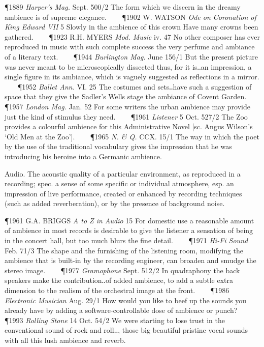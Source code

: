 \begin{description}[wide, labelwidth=!, labelindent=0pt]
\begin{myenumerate}
\P 1889 \textit{Harper's Mag.} Sept. 500/2 The form which we discern in the dreamy ambience is of supreme elegance.    
\P 1902 W. WATSON \textit{Ode on Coronation of King Edward VII} 5 Slowly in the ambience of this crown Have many crowns been gathered.    
\P 1923 R.H. MYERS \textit{Mod. Music} iv. 47 No other composer has ever reproduced in music with such complete success the very perfume and ambiance of a literary text.    
\P 1944 \textit{Burlington Mag.} June 156/1 But the present picture was never meant to be microscopically dissected thus, for it is‥an impression, a single figure in its ambiance, which is vaguely suggested as reflections in a mirror.    
\P 1952 \textit{Ballet Ann.} VI. 25 The costumes and sets‥have such a suggestion of space that they give the Sadler's Wells stage the ambiance of Covent Garden.    
\P 1957 \textit{London Mag.} Jan. 52 For some writers the urban ambience may provide just the kind of stimulus they need.    
\P 1961 \textit{Listener} 5 Oct. 527/2 The Zoo provides a colourful ambience for this Administrative Novel [sc. Angus Wilson's ‘Old Men at the Zoo’].    
\P 1965 \textit{N. \& Q.} CCX. 15/1 The way in which the poet by the use of the traditional vocabulary gives the impression that he was introducing his heroine into a Germanic ambience.
 
 Audio. The acoustic quality of a particular environment, as reproduced in a recording; spec. a sense of some specific or individual atmosphere, esp. an impression of live performance, created or enhanced by recording techniques (such as added reverberation), or by the presence of background noise. 

\P 1961 G.A. BRIGGS \textit{A to Z in Audio} 15 For domestic use a reasonable amount of ambience in most records is desirable to give the listener a sensation of being in the concert hall, but too much blurs the fine detail.    
\P 1971 \textit{Hi-Fi Sound} Feb. 71/3 The shape and the furnishing of the listening room, modifying the ambience that is built-in by the recording engineer, can broaden and smudge the stereo image.    
\P 1977 \textit{Gramophone} Sept. 512/2 In quadraphony the back speakers make the contribution‥of added ambience, to add a subtle extra dimension to the realism of the orchestral image at the front.    
\P 1986 \textit{Electronic Musician} Aug. 29/1 How would you like to beef up the sounds you already have by adding a software-controllable dose of ambience or punch?    
\P 1993 \textit{Rolling Stone} 14 Oct. 54/2 We were starting to lose trust in the conventional sound of rock and roll‥, those big beautiful pristine vocal sounds with all this lush ambience and reverb.


\end{myenumerate}
\end{description}
